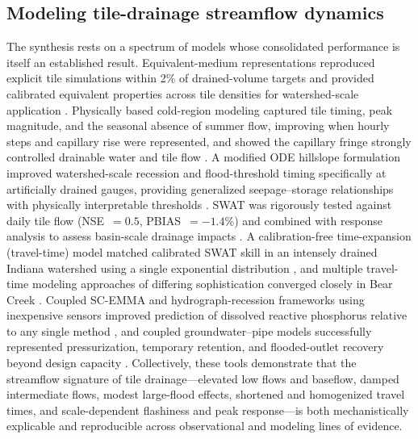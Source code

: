 \documentclass[11pt]{article}
\begin{document}
\subsection{Modeling tile-drainage streamflow dynamics}

The synthesis rests on a spectrum of models whose consolidated performance is itself an established result. Equivalent-medium representations reproduced explicit tile simulations within 2\% of drained-volume targets and provided calibrated equivalent properties across tile densities for watershed-scale application \parencite{Thomas2016}. Physically based cold-region modeling captured tile timing, peak magnitude, and the seasonal absence of summer flow, improving when hourly steps and capillary rise were represented, and showed the capillary fringe strongly controlled drainable water and tile flow \parencite{Kompanizare2024}. A modified ODE hillslope formulation improved watershed-scale recession and flood-threshold timing specifically at artificially drained gauges, providing generalized seepage--storage relationships with physically interpretable thresholds \parencite{Fonley2021}. SWAT was rigorously tested against daily tile flow (NSE~$=0.5$, PBIAS~$=-1.4$\%) and combined with response analysis to assess basin-scale drainage impacts \parencite{Rahman2014}. A calibration-free time-expansion (travel-time) model matched calibrated SWAT skill in an intensely drained Indiana watershed using a single exponential distribution \parencite{Basu2010}, and multiple travel-time modeling approaches of differing sophistication converged closely in Bear Creek \parencite{Schilling2015}. Coupled SC-EMMA and hydrograph-recession frameworks using inexpensive sensors improved prediction of dissolved reactive phosphorus relative to any single method \parencite{Nazari2021}, and coupled groundwater--pipe models successfully represented pressurization, temporary retention, and flooded-outlet recovery beyond design capacity \parencite{Henine2014}. Collectively, these tools demonstrate that the streamflow signature of tile drainage---elevated low flows and baseflow, damped intermediate flows, modest large-flood effects, shortened and homogenized travel times, and scale-dependent flashiness and peak response---is both mechanistically explicable and reproducible across observational and modeling lines of evidence.

\printbibliography
\end{document}
